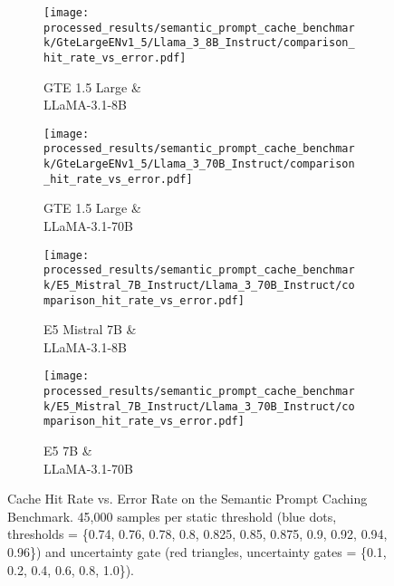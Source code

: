 \begin{figure*}[t]
    \centering
    \begin{subfigure}[b]{0.24\textwidth}
        \centering
        \texttt{[image: processed\_results/semantic\_prompt\_cache\_benchmark/GteLargeENv1\_5/Llama\_3\_8B\_Instruct/comparison\_hit\_rate\_vs\_error.pdf]}
        \caption{GTE 1.5 Large \& \\ LLaMA-3.1-8B}
        \label{fig:pdf1}
    \end{subfigure}\hfill
    \begin{subfigure}[b]{0.24\textwidth}
        \centering
        \texttt{[image: processed\_results/semantic\_prompt\_cache\_benchmark/GteLargeENv1\_5/Llama\_3\_70B\_Instruct/comparison\_hit\_rate\_vs\_error.pdf]}
        \caption{GTE 1.5 Large \& \\ LLaMA-3.1-70B}
        \label{fig:pdf2}
    \end{subfigure}\hfill
    \begin{subfigure}[b]{0.24\textwidth}
        \centering
        \texttt{[image: processed\_results/semantic\_prompt\_cache\_benchmark/E5\_Mistral\_7B\_Instruct/Llama\_3\_70B\_Instruct/comparison\_hit\_rate\_vs\_error.pdf]}
        \caption{E5 Mistral 7B \& \\ LLaMA-3.1-8B}
        \label{fig:pdf3}
    \end{subfigure}
    \begin{subfigure}[b]{0.24\textwidth}
        \centering
        \texttt{[image: processed\_results/semantic\_prompt\_cache\_benchmark/E5\_Mistral\_7B\_Instruct/Llama\_3\_70B\_Instruct/comparison\_hit\_rate\_vs\_error.pdf]}
        \caption{E5 7B \& \\ LLaMA-3.1-70B}
        \label{fig:pdf3}
    \end{subfigure}
    \caption{Cache Hit Rate vs. Error Rate on the Semantic Prompt Caching Benchmark. 45,000 samples per static threshold (blue dots, thresholds = \{0.74, 0.76, 0.78, 0.8, 0.825, 0.85, 0.875, 0.9, 0.92, 0.94, 0.96\}) and uncertainty gate (red triangles, uncertainty gates = \{0.1, 0.2, 0.4, 0.6, 0.8, 1.0\}).}
    \label{fig:cache-hit-vs-error-rate}
\end{figure*}

